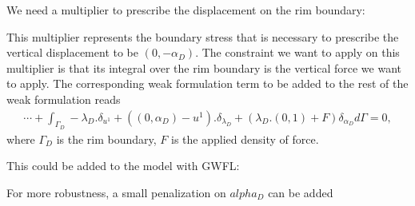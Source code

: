 \documentclass[a4paper,11pt,english]{sphinxmanual}
\begin{document}
\sphinxAtStartPar
We need a multiplier to prescribe the displacement on the rim boundary:

\begin{sphinxVerbatim}[commandchars=\\\{\}]
  
\end{sphinxVerbatim}

\sphinxAtStartPar
This multiplier represents the boundary stress that is necessary to prescribe the vertical displacement to be \((0, -\alpha_D)\). The constraint we want to apply on this multiplier is that its integral over the rim boundary is the vertical force we want to apply. The corresponding weak formulation term to be added to the rest of the weak formulation reads
\begin{equation*}
\begin{split}\cdots + \int_{\Gamma_D} -\lambda_D.\delta_{u^1} + ((0, \alpha_D) - u^1).\delta_{\lambda_D} + (\lambda_D.(0,1) + F)\delta_{\alpha_D} d\Gamma = 0,\end{split}
\end{equation*}
\sphinxAtStartPar
where \(\Gamma_D\) is the rim boundary, \(F\) is the applied density of force.

\sphinxAtStartPar
This could be added to the model with GWFL:

\begin{sphinxVerbatim}[commandchars=\\\{\}]
 \PYG{p}{[}\PYG{p}{]}
 
       
\end{sphinxVerbatim}

\sphinxAtStartPar
For more robustness, a small penalization on \(alpha_D\) can be added
\end{document}

